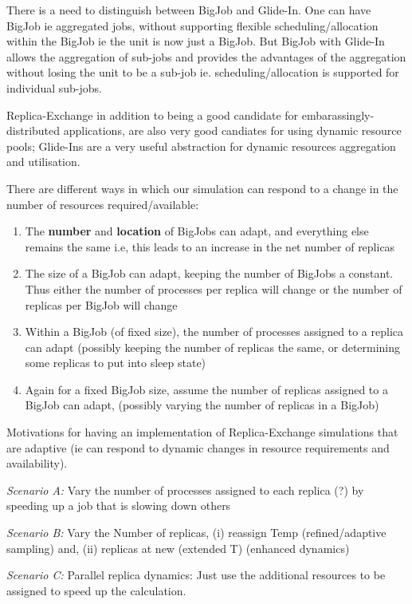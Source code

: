 \documentclass{rspublic}
\begin{document}
{There is a need to distinguish between BigJob and Glide-In. One can
have BigJob ie aggregated jobs, without supporting flexible
scheduling/allocation within the BigJob ie the unit is now just a
BigJob. But BigJob with Glide-In allows the aggregation of sub-jobs
and provides the advantages of the aggregation without losing the unit
to be a sub-job ie. scheduling/allocation is supported for individual
sub-jobs.

Replica-Exchange in addition to being a good candidate for
embarassingly-distributed applications, are also very good candiates
for using dynamic resource pools; Glide-Ins are a very useful
abstraction for dynamic resources aggregation and utilisation.

There are different ways in which our simulation can respond
to a change in the number of resources required/available:

\begin{enumerate}
\item The {\bf number} and {\bf location} of BigJobs can adapt, and
  everything else remains the same i.e, this leads to an increase in
  the net number of replicas
\item The size of a BigJob can adapt, keeping the number of BigJobs a
  constant. Thus either the number of processes per replica will
  change or the number of replicas per BigJob will change
\item Within a BigJob (of fixed size), the number of processes
  assigned to a replica can adapt (possibly keeping the number of
  replicas the same, or determining some replicas to put into sleep
  state)
\item Again for a fixed BigJob size, assume the number of replicas
  assigned to a BigJob can adapt, (possibly varying the number of
  replicas in a BigJob)
\end{enumerate}

Motivations for having an implementation of Replica-Exchange
simulations that are adaptive (ie can respond to dynamic changes in
resource requirements and availability).

{\it Scenario A:} Vary the number of processes assigned to each
replica (?) by speeding up a job that is slowing down others

{\it Scenario B:} Vary the Number of replicas, (i) reassign Temp
(refined/adaptive sampling) and, (ii) replicas at new (extended T)
(enhanced dynamics)

{\it Scenario C:} Parallel replica dynamics: Just use the additional
resources to be assigned to speed up the calculation.

}
\end{document}
